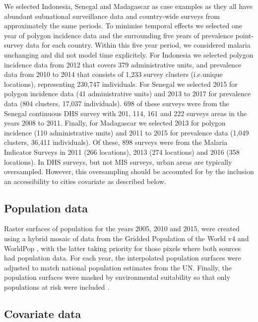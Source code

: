 \documentclass{statsoc}
\begin{document}
We selected Indonesia, Senegal and Madagascar as case examples as they all have abundant subnational surveillance data and country-wide surveys from approximately the same periods.
To minimise temporal effects we selected one year of polygon incidence data and the surrounding five years of prevalence point-survey data for each country.
Within this five year period, we considered malaria unchanging and did not model time explicitely.
For Indonesia we selected polygon incidence data from 2012 that covers 379 administrative units, and prevalence data from 2010 to 2014 that consists of 1,233 survey clusters (i.e.\thinspace unique locations), representing 230,747 individuals.
For Senegal we selected 2015 for polygon incidence data (41 administrative units) and 2013 to 2017 for prevalence data (804 clusters, 17,037 individuals).
698 of these surveys were from the Senegal continuous DHS survey with 201, 114, 161 and 222 surveys areas in the years 2008 to 2011. 
Finally, for Madagascar we selected 2013 for polygon incidence (110 administrative units) and 2011 to 2015 for prevalence data (1,049 clusters, 36,411 individuals).
Of these, 898 surveys were from the Malaria Indicator Surveys in 2011 (266 locations), 2013 (274 locations) and 2016 (358 locations).
In DHS surveys, but not MIS surveys, urban areas are typically oversampled.
However, this oversampling should be accounted for by the inclusion an accessibility to cities covariate as described below.


\subsection*{Population data}

Raster surfaces of population for the years 2005, 2010 and 2015, were created using a hybrid mosaic of data from the Gridded Population of the World v4 \citep{gpw4} and WorldPop \citep{tatem2017worldpop}, with the latter taking priority for those pixels where both sources had population data.
For each year, the interpolated population surfaces were adjusted to match national population estimates from the UN. 
Finally, the population surfaces were masked by environmental suitability so that only populations at risk were included \citep{weiss2019mapping}.


\subsection*{Covariate data}
\end{document}
